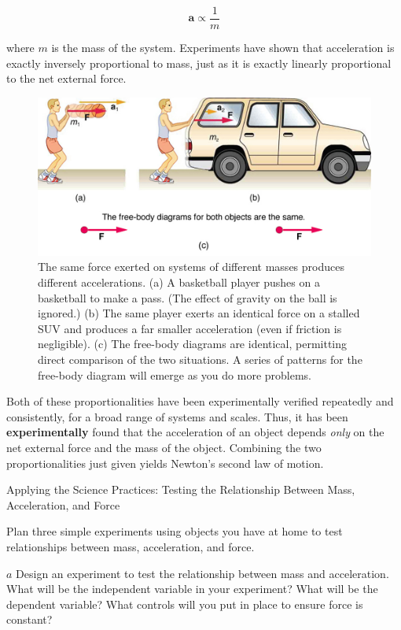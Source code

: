 \documentclass[
]{book}
\begin{document}
\leavevmode{}%
\[{\textbf{a}{\propto}\frac{1}{m}}{}\]

where \(m{}\)\emph{} is the mass of the system.
Experiments have shown that acceleration is exactly inversely
proportional to mass, just as it is exactly linearly proportional to the
net external force.

\begin{figure}
\hypertarget{import-auto-id1375143}{%
\centering
\includegraphics{images/Figure 04_03_02.jpg}
\caption{The same force exerted on systems of different masses produces
different accelerations. (a) A basketball player pushes on a basketball
to make a pass. (The effect of gravity on the ball is ignored.) (b) The
same player exerts an identical force on a stalled SUV and produces a
far smaller acceleration (even if friction is negligible). (c) The
free-body diagrams are identical, permitting direct comparison of the
two situations. A series of patterns for the free-body diagram will
emerge as you do more
problems.}\label{import-auto-id1375143}
}
\end{figure}

Both of these proportionalities have been experimentally verified
repeatedly and consistently, for a broad range of systems and scales.
Thus, it has been \textbf{experimentally} found that the acceleration of an
object depends \emph{only} on the net external force and the mass of the
object. Combining the two proportionalities just given yields Newton's
second law of motion.

\hypertarget{fs-id1452745}{}
Applying the Science Practices: Testing the Relationship Between Mass,
Acceleration, and Force

Plan three simple experiments using objects you have at home to test
relationships between mass, acceleration, and force.

\(a\) Design an experiment to test the relationship between mass and
acceleration. What will be the independent variable in your experiment?
What will be the dependent variable? What controls will you put in place
to ensure force is constant?
\end{document}
